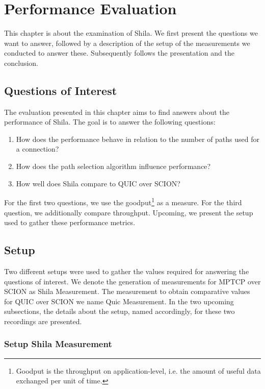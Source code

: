\chapter{Performance Evaluation}
\label{chap:PerformanceEvaluation}

This chapter is about the examination of Shila. We first present the questions we want to answer, followed by a description of the setup of the measurements we conducted to answer these. Subsequently follows the presentation and the conclusion.

\section{Questions of Interest}
\label{sec:QuestionsOfInterest}

The evaluation presented in this chapter aims to find answers about the performance of Shila. The goal is to answer the following questions:

{\small \begin{enumerate}
	\item How does the performance behave in relation to the number of paths used for a connection?
	\item How does the path selection algorithm influence performance?
	\item How well does Shila compare to QUIC over SCION?
\end{enumerate}}

For the first two questions, we use the goodput\footnote{Goodput is the throughput on application-level, i.e. the amount of useful data exchanged per unit of time.} as a measure. For the third question, we additionally compare throughput. Upcoming, we present the setup used to gather these performance metrics.

\section{Setup}
\label{subsec:Setup}

Two different setups were used to gather the values required for answering the questions of interest. We denote the generation of measurements for MPTCP over SCION as Shila Measurement. The measurement to obtain comparative values for QUIC over SCION we name Quic Measurement. In the two upcoming subsections, the details about the setup, named accordingly, for these two recordings are presented.

\subsection*{Setup Shila Measurement} 


